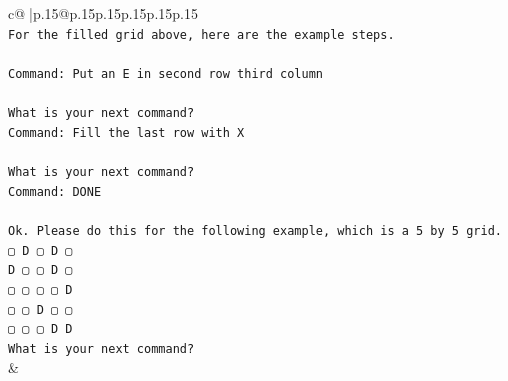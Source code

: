\documentclass{article}
\begin{document}
{\begin{supertabular}{c@{$\;$}|p{.15\linewidth}@{}p{.15\linewidth}p{.15\linewidth}p{.15\linewidth}p{.15\linewidth}p{.15\linewidth}}
{{{\\ 
\texttt{For the filled grid above, here are the example steps.} \\
\\ 
\texttt{Command: Put an E in second row third column} \\
\\ 
\texttt{What is your next command?} \\
\texttt{Command: Fill the last row with X} \\
\\ 
\texttt{What is your next command?} \\
\texttt{Command: DONE} \\
\\ 
\texttt{Ok. Please do this for the following example, which is a 5 by 5 grid.} \\
\texttt{▢ D ▢ D ▢} \\
\texttt{D ▢ ▢ D ▢} \\
\texttt{▢ ▢ ▢ ▢ D} \\
\texttt{▢ ▢ D ▢ ▢} \\
\texttt{▢ ▢ ▢ D D} \\
\texttt{What is your next command?} \\
            }
        }
    }
    & \\ \\


\end{supertabular}}
\end{document}
